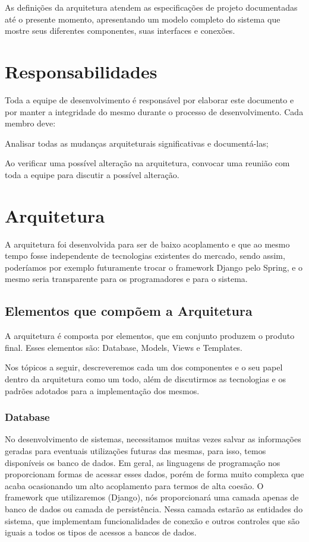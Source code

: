 As definições da arquitetura atendem as especificações de projeto documentadas 
até o presente momento, apresentando um modelo completo do sistema que mostre 
seus diferentes componentes, suas interfaces e conexões.

\section{Responsabilidades}
Toda a equipe de desenvolvimento é responsável por elaborar este documento  e 
por manter a integridade do mesmo durante o processo de desenvolvimento. Cada 
membro deve:
\begin{alineascomponto}
	\item Analisar todas as mudanças arquiteturais significativas e 
documentá-las;
    \item Ao verificar uma possível alteração na arquitetura, convocar uma 
reunião com toda a equipe para discutir a possível alteração. 
\end{alineascomponto}

\section{Arquitetura}
A arquitetura foi desenvolvida para ser de baixo acoplamento e que ao mesmo 
tempo fosse independente de tecnologias existentes do mercado, sendo assim, 
poderíamos por exemplo futuramente trocar o framework Django pelo Spring, e o 
mesmo seria transparente para os programadores e para o sistema.

\subsection{Elementos que compõem a Arquitetura}
A arquitetura é composta por elementos, que em conjunto produzem o produto 
final. Esses elementos são: Database, Models, Views e Templates.

Nos tópicos a seguir, descreveremos cada um dos componentes e o seu papel  dentro 
da arquitetura como um todo, além de discutirmos as tecnologias e os padrões 
adotados para a implementação dos mesmos.

\subsubsection{Database}
No desenvolvimento de sistemas, necessitamos muitas vezes salvar as informações 
geradas para eventuais utilizações futuras das mesmas, para isso, temos disponíveis os 
banco de dados. Em geral, as linguagens de programação nos proporcionam formas 
de acessar esses dados, porém de forma muito  complexa que acaba ocasionando um 
alto acoplamento para termos de alta coesão. O framework que utilizaremos (Django), nós 
proporcionar\'a uma camada apenas de banco de dados ou camada de persistência. Nessa camada estar\~ao as entidades do sistema, que implementam funcionalidades de conexão e outros controles que são 
iguais a todos os tipos de acessos a bancos de dados. 

